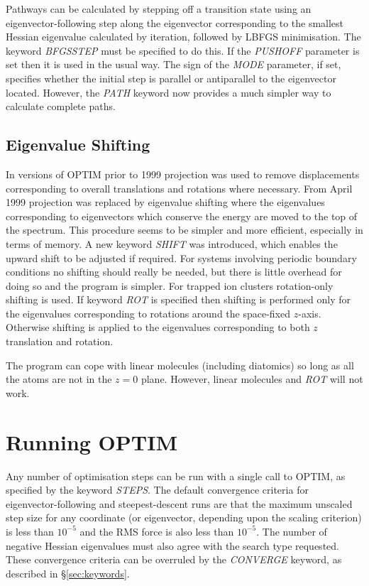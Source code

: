 \documentclass[12pt,a4paper,dvips]{article}
\begin{document}
Pathways can be calculated by stepping off a transition state using an eigenvector-following
step along the eigenvector corresponding to the smallest Hessian eigenvalue calculated
by iteration, followed by LBFGS minimisation. The keyword {\it BFGSSTEP\/}
must be specified to do this. If the {\it PUSHOFF\/}
parameter is set then it is used in the usual way. The sign of the {\it MODE\/} parameter,
if set, specifies whether the initial step is parallel or antiparallel to the
eigenvector located. However, the {\it PATH\/} keyword now provides a much simpler way
to calculate complete paths.

\subsection{Eigenvalue Shifting}In versions of OPTIM prior to 1999
projection was used to remove displacements corresponding to 
overall translations and rotations where necessary.\cite{bakerh91,wales93d}
From April 1999 projection was replaced by eigenvalue shifting where the
eigenvalues corresponding to eigenvectors which conserve the energy
are moved to the top of the spectrum. This procedure seems to be simpler
and more efficient, especially in terms of memory. A new keyword {\it SHIFT}
was introduced, which enables the upward shift to be adjusted if required.
For systems involving periodic boundary conditions no shifting should really be
needed, but there is little overhead for doing so and the program is simpler.
For trapped ion clusters
rotation-only shifting is used. If keyword {\it ROT\/} is specified then shifting is performed
only for the eigenvalues corresponding to
rotations around the space-fixed $z$-axis. Otherwise shifting is applied to the
eigenvalues corresponding to both $z$ translation and rotation.

The program can cope with linear molecules (including diatomics) so long as all the atoms
are not in the $z=0$ plane. However, linear molecules and {\it ROT\/} will not work.

\section{Running OPTIM}
\label{sec:running}
Any number of optimisation steps can be run with a
single call to OPTIM, as specified by the keyword {\it STEPS\/}.
The default convergence criteria for eigenvector-following and steepest-descent runs are
that the maximum unscaled step size for
any coordinate (or eigenvector, depending upon the scaling criterion) is less
than $10^{-5}$ and the RMS force is also less than $10^{-5}$.
The number of negative Hessian eigenvalues must also agree with the search type requested.
These convergence criteria can be overruled by the 
{\it CONVERGE\/} keyword, as described in \S\ref{sec:keywords}.
\end{document}

